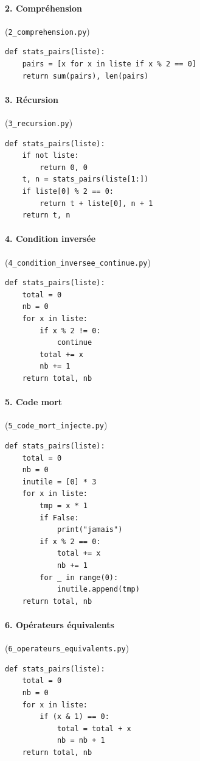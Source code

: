 \documentclass[12pt,a4paper,oneside]{report}
\begin{document}
\paragraph{2. Compréhension} (\texttt{2\_comprehension.py})
\begin{lstlisting}[style=pyncst]
def stats_pairs(liste):
    pairs = [x for x in liste if x % 2 == 0]
    return sum(pairs), len(pairs)
\end{lstlisting}

\paragraph{3. Récursion} (\texttt{3\_recursion.py})
\begin{lstlisting}[style=pyncst]
def stats_pairs(liste):
    if not liste:
        return 0, 0
    t, n = stats_pairs(liste[1:])
    if liste[0] % 2 == 0:
        return t + liste[0], n + 1
    return t, n
\end{lstlisting}

\paragraph{4. Condition inversée} (\texttt{4\_condition\_inversee\_continue.py})
\begin{lstlisting}[style=pyncst]
def stats_pairs(liste):
    total = 0
    nb = 0
    for x in liste:
        if x % 2 != 0:
            continue
        total += x
        nb += 1
    return total, nb
\end{lstlisting}

\paragraph{5. Code mort} (\texttt{5\_code\_mort\_injecte.py})
\begin{lstlisting}[style=pyncst]
def stats_pairs(liste):
    total = 0
    nb = 0
    inutile = [0] * 3
    for x in liste:
        tmp = x * 1
        if False:
            print("jamais")
        if x % 2 == 0:
            total += x
            nb += 1
        for _ in range(0):
            inutile.append(tmp)
    return total, nb
\end{lstlisting}

\paragraph{6. Opérateurs équivalents} (\texttt{6\_operateurs\_equivalents.py})
\begin{lstlisting}[style=pyncst]
def stats_pairs(liste):
    total = 0
    nb = 0
    for x in liste:
        if (x & 1) == 0:
            total = total + x
            nb = nb + 1
    return total, nb
\end{lstlisting}
\end{document}
